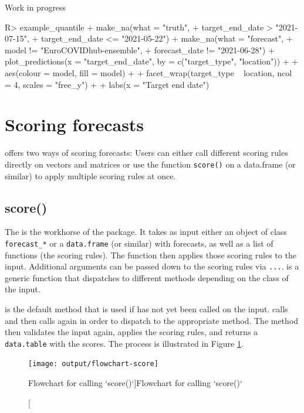 \documentclass[
]{jss}
\begin{document}
Work in progress

\begin{CodeChunk}
\begin{CodeInput}
R> example_quantile %
+   make_na(what = "truth", 
+           target_end_date > "2021-07-15",
+           target_end_date <= "2021-05-22") %
+   make_na(what = "forecast", 
+           model != "EuroCOVIDhub-ensemble",
+           forecast_date != "2021-06-28") %
+   plot_predictions(x = "target_end_date", by = c("target_type", "location")) +
+   aes(colour = model, fill = model) +
+   facet_wrap(target_type ~ location, ncol = 4, scales = "free_y") +
+   labs(x = "Target end date")
\end{CodeInput}
\end{CodeChunk}

\section{Scoring forecasts}\label{scoring-forecasts}

 offers two ways of scoring forecasts: Users can
either call different scoring rules directly on vectors and matrices or
use the function \texttt{score()} on a data.frame (or similar) to apply
multiple scoring rules at once.

\subsection{score()}\label{score}

The  is the workhorse of the package. It takes as input
either an object of class \texttt{forecast\_*} or a \texttt{data.frame}
(or similar) with forecasts, as well as a list of functions (the scoring
rules). The function then applies those scoring rules to the input.
Additional arguments can be passed down to the scoring rules via
\texttt{...}.  is a generic function that dispatches to
different methods depending on the class of the input.

 is the default method that is used if
 has not yet been called on the input.
 calls  and then calls
 again in order to dispatch to the appropriate method. The
method then validates the input again, applies the scoring rules, and
returns a \texttt{data.table} with the scores. The process is
illustrated in Figure \ref{fig:flowchart-score}.

\begin{CodeChunk}
\begin{figure}[!h]

{\centering \texttt{[image: output/flowchart-score]} 

}

\caption[Flowchart for calling `score()`]{Flowchart for calling `score()`}\label{fig:flowchart-score}
\end{figure}
\end{CodeChunk}
\end{document}
